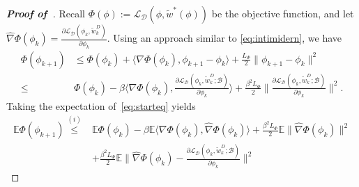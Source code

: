 \documentclass{osudissert96}
\def\gB{{\mathcal{B}}}
\def\gD{{\mathcal{D}}}
\def\gL{{\mathcal{L}}}
\def\gS{{\mathcal{S}}}
\newtheorem{theorem}{Theorem}
\begin{document}
\begin{proof}[\bf Proof of~] 
Recall $\Phi(\phi):=\gL_{\gD} (\phi,\widetilde w^{*}(\phi))$ be the objective function, and let $\widehat \nabla\Phi(\phi_k) = \frac{\partial \gL_{\gD} (\phi_k, \widetilde w^D_k)}{\partial \phi_k} $.
Using an approach similar to \cref{eq:intimidern}, we have 
\begin{align}\label{eq:starteq}
\Phi(\phi_{k+1}) &\leq \Phi(\phi_k)  + \langle \nabla \Phi(\phi_k), \phi_{k+1}-\phi_k\rangle + \frac{L_\Phi}{2} \|\phi_{k+1}-\phi_k\|^2 \nonumber
\\\leq& \Phi(\phi_k)  - \beta \Big\langle \nabla \Phi(\phi_k), \frac{\partial \gL_{\gD} (\phi_k, \widetilde w^D_k;\gB)}{\partial \phi_k}\Big\rangle + \frac{\beta^2L_\Phi}{2} \Big\| \frac{\partial \gL_{\gD} (\phi_k, \widetilde w^D_k;\gB)}{\partial \phi_k} \Big\|^2.
\end{align}
Taking the expectation of~\cref{eq:starteq}  yields
{\small
\begin{align}\label{eq:uijks}
\mathbb{E}\Phi(\phi_{k+1}) \overset{(i)}\leq& \mathbb{E}\Phi(\phi_k)  - \beta \mathbb{E}\big\langle \nabla \Phi(\phi_k),\widehat \nabla\Phi(\phi_k)\big\rangle +\frac{\beta^2L_\Phi}{2}\mathbb{E} \|\widehat \nabla\Phi(\phi_k)\|^2\nonumber
\\&+ \frac{\beta^2L_\Phi}{2}\mathbb{E} \Big\| \widehat \nabla\Phi(\phi_k)-\frac{\partial \gL_{\gD} (\phi_k, \widetilde w^D_k;\gB)}{\partial \phi_k} \Big\|^2  \nonumber

\end{align}}
\end{proof}
\end{document}
